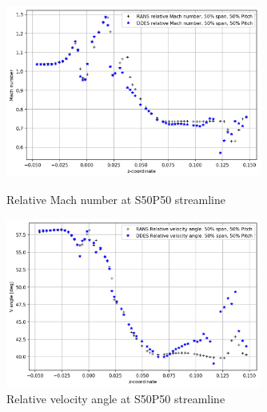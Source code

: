 \begin{figure}[ht]
  \centering
  \includegraphics[width=0.75\textwidth]{Pictures/mach-rel-S50-P50.png}
  \caption{Relative Mach number at S50P50 streamline} \label{mach-rel-S50-P50}
  \vspace*{\floatsep}%
  \includegraphics[width=0.75\textwidth]{Pictures/vang-rel-S50-P50.png}
  \caption{Relative velocity angle at S50P50 streamline} \label{vang-rel-S50-P50}
\end{figure}

